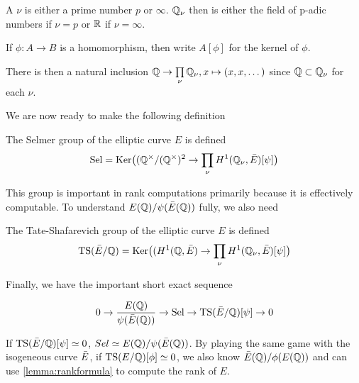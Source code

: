\documentclass[12pt, a4paper]{amsart}
\begin{document}
\begin{defn}
  A  $\nu$ is either a prime number $p$ or $\infty$. ${\mathbb Q}_\nu$ then is
  either the field of p-adic numbers if $\nu = p$ or ${\mathbb R}$ if $\nu = \infty$.
\end{defn}

\begin{defn}
  If $\phi: A \rightarrow B$ is a homomorphism, then write $A[\phi]$ for the
  kernel of $\phi$.
\end{defn}

There is then a natural inclusion ${\mathbb Q} \rightarrow \prod\limits_\nu {\mathbb Q}_\nu,
x \mapsto (x, x, \dots)$ since ${\mathbb Q} \subset {\mathbb Q}_{\nu}$ for each $\nu$.


We are now ready to make the following definition

\begin{defn}
  The Selmer group of the elliptic curve $E$ is defined
  $$\text{Sel} = \text{Ker}\big(({\mathbb Q}^{\times}/({\mathbb Q}^{\times})^2 \rightarrow
  \prod\limits_\nu H^1({\mathbb Q}_\nu, \bar{E})[\psi]\big)$$
\end{defn}

This group is important in rank computations primarily because it is effectively
computable. To understand $E({\mathbb Q})/\psi(\bar{E}({\mathbb Q}))$ fully, we also need

\begin{defn} \label{defn:sha}
  The Tate-Shafarevich group of the elliptic curve $E$ is defined
  $$ \text{TS}(\bar{E} / {\mathbb Q}) = \text{Ker} \big((H^1({\mathbb Q}, \bar{E}) \rightarrow \prod\limits_\nu H^1 ({\mathbb Q}_\nu,
  \bar{E})[\psi]\big) $$
\end{defn}

Finally, we have the important short exact sequence

\[ 0 \rightarrow \frac{E({\mathbb Q})}{\psi(\bar{E}({\mathbb Q}))} \rightarrow \text{Sel} \rightarrow \text{TS}(\bar{E}/{\mathbb Q})[\psi] \rightarrow 0\]

If $\text{TS}(\bar{E}/{\mathbb Q})[\psi] \simeq 0$, $Sel \simeq E({\mathbb Q})/\psi(\bar{E}({\mathbb Q}))$. By playing
the same game with the isogeneous curve $\bar{E}$, if $\text{TS}(E/{\mathbb Q})[\phi] \simeq 0$,
we also know $\bar{E}({\mathbb Q})/\phi(E({\mathbb Q}))$ and can use \ref{lemma:rankformula} to compute
the rank of $E$. 
\end{document}
